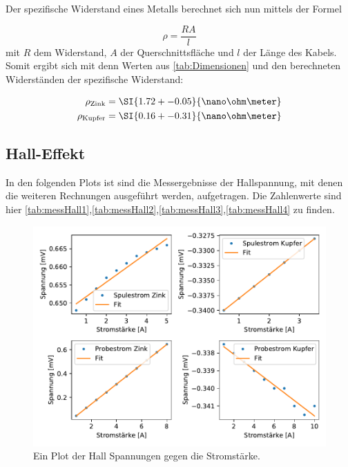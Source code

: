     Der spezifische Widerstand eines Metalls berechnet sich nun mittels der Formel

    \begin{equation}
        \rho = \frac{RA}{l}
    \end{equation}
    \noindent
    mit $R$ dem Widerstand, $A$ der Querschnittsfläche und $l$ der Länge des Kabels.
    Somit ergibt sich mit denn Werten aus \ref{tab:Dimensionen} und den berechneten Widerständen der spezifische Widerstand:

    \begin{align}
        \rho_\text{Zink} &= \SI{1.72+-0.05}{\nano\ohm\meter} \nonumber\\
        \rho_\text{Kupfer} &= \SI{0.16+-0.31}{\nano\ohm\meter} \nonumber
    \end{align}


    \subsection{Hall-Effekt}

    

    In den folgenden Plots ist sind die Messergebnisse der Hallspannung, mit denen die weiteren Rechnungen ausgeführt werden, 
    aufgetragen. Die Zahlenwerte sind hier \ref{tab:messHall1},\ref{tab:messHall2},\ref{tab:messHall3},\ref{tab:messHall4} zu finden.
    

    \begin{figure}[H]
        \centering
        \includegraphics[width=1.1\textwidth]{build/Hall.pdf}
        \caption{Ein Plot der Hall Spannungen gegen die Stromstärke.}
        \label{img:messHall}
    \end{figure}
    
